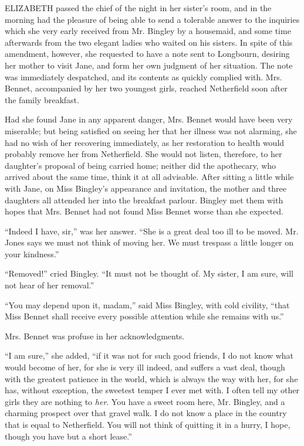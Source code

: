 \documentclass[12pt,openright]{book}
\begin{document}
\noindent  ELIZABETH passed the chief of the night in her sister’s room, and in the morning had the pleasure of being able to send a tolerable answer to the inquiries which she very early received from Mr. Bingley by a housemaid, and some time afterwards from the two elegant ladies who waited on his sisters. In spite of this amendment, however, she requested to have a note sent to Longbourn, desiring her mother to visit Jane, and form her own judgment of her situation. The note was immediately despatched, and its contents as quickly complied with. Mrs. Bennet, accompanied by her two youngest girls, reached Netherfield soon after the family breakfast.

Had she found Jane in any apparent danger, Mrs. Bennet would have been very miserable; but being satisfied on seeing her that her illness was not alarming, she had no wish of her recovering immediately, as her restoration to health would probably remove her from Netherfield. She would not listen, therefore, to her daughter’s proposal of being carried home; neither did the apothecary, who arrived about the same time, think it at all advisable. After sitting a little while with Jane, on Miss Bingley’s appearance and invitation, the mother and three daughters all attended her into the breakfast parlour. Bingley met them with hopes that Mrs. Bennet had not found Miss Bennet worse than she expected.

“Indeed I have, sir,” was her answer. “She is a great deal too ill to be moved. Mr. Jones says we must not think of moving her. We must trespass a little longer on your kindness.”

“Removed!” cried Bingley. “It must not be thought of. My sister, I am sure, will not hear of her removal.”

“You may depend upon it, madam,” said Miss Bingley, with cold civility, “that Miss Bennet shall receive every possible attention while she remains with us.”

Mrs. Bennet was profuse in her acknowledgments.

“I am sure,” she added, “if it was not for such good friends, I do not know what would become of her, for she is very ill indeed, and suffers a vast deal, though with the greatest patience in the world, which is always the way with her, for she has, without exception, the sweetest temper I ever met with. I often tell my other girls they are nothing to \textit{her}. You have a sweet room here, Mr. Bingley, and a charming prospect over that gravel walk. I do not know a place in the country that is equal to Netherfield. You will not think of quitting it in a hurry, I hope, though you have but a short lease.”
\end{document}
